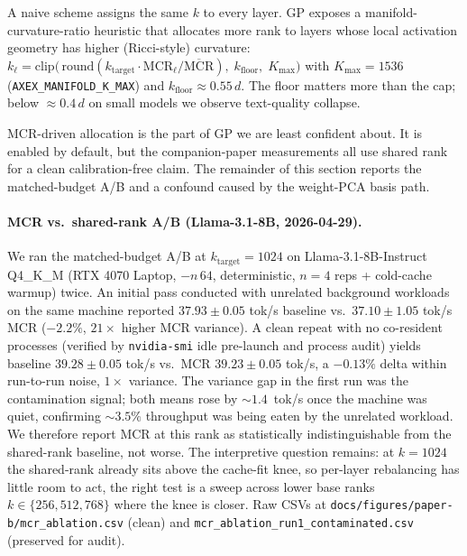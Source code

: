 \documentclass[11pt]{article}
\begin{document}
A naive scheme assigns the same $k$ to every layer.  GP exposes a
manifold-curvature-ratio heuristic that allocates more rank to layers
whose local activation geometry has higher (Ricci-style) curvature:
$k_\ell = \mathrm{clip}\bigl(\,\mathrm{round}(k_\text{target}\cdot
\mathrm{MCR}_\ell/\overline{\mathrm{MCR}}),\;k_\text{floor},\;K_\text{max}\bigr)$
with $K_\text{max}{=}1536$ (\texttt{AXEX\_MANIFOLD\_K\_MAX}) and
$k_\text{floor}\approx 0.55\,d$.  The floor matters more than the cap; below
$\approx 0.4\,d$ on small models we observe text-quality collapse.

MCR-driven allocation is the part of GP we are least confident about.
It is enabled by default, but the companion-paper measurements all use
shared rank for a clean calibration-free claim. The remainder of this
section reports the matched-budget A/B and a confound caused by the
weight-PCA basis path.

\paragraph{MCR vs.\ shared-rank A/B (Llama-3.1-8B, 2026-04-29).}
We ran the matched-budget A/B at $k_\text{target}{=}1024$ on
Llama-3.1-8B-Instruct Q4\_K\_M (RTX 4070 Laptop, $-n\,64$, deterministic,
$n{=}4$ reps + cold-cache warmup) twice. An initial pass conducted with
unrelated background workloads on the same machine reported
$37.93\pm 0.05$ tok/s baseline vs.\ $37.10\pm 1.05$ tok/s MCR
($-2.2\%$, $21\times$ higher MCR variance). A clean repeat with no
co-resident processes (verified by \texttt{nvidia-smi} idle pre-launch
and process audit) yields baseline $39.28\pm 0.05$ tok/s vs.\ MCR
$39.23\pm 0.05$ tok/s, a $-0.13\%$ delta within run-to-run
noise, $1{\times}$ variance. The variance gap in the first run was
the contamination signal; both means rose by $\sim 1.4$~tok/s once the
machine was quiet, confirming $\sim 3.5\%$ throughput was being eaten
by the unrelated workload. We therefore report MCR at this rank as
statistically indistinguishable from the shared-rank baseline,
not worse. The interpretive question remains: at $k{=}1024$ the
shared-rank already sits above the cache-fit knee, so per-layer
rebalancing has little room to act, the right test is a sweep across
lower base ranks $k{\in}\{256, 512, 768\}$ where the knee is closer.
Raw CSVs at \texttt{docs/figures/paper-b/mcr\_ablation.csv} (clean) and
\texttt{mcr\_ablation\_run1\_contaminated.csv} (preserved for audit).
\end{document}
